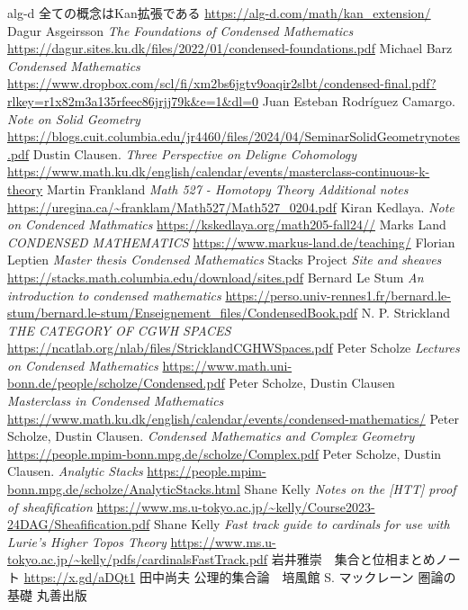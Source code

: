 \documentclass[dvipdfmx,a4paper,11pt]{report}
\theoremstyle{definition}
\begin{document}
\begin{thebibliography}{n}
alg-d 全ての概念はKan拡張である
\url{https://alg-d.com/math/kan_extension/}
Dagur Asgeirsson
\textit{The Foundations of Condensed Mathematics}
\url{https://dagur.sites.ku.dk/files/2022/01/condensed-foundations.pdf}
Michael Barz \textit{Condensed Mathematics}
\url{https://www.dropbox.com/scl/fi/xm2bs6jgtv9oaqir2slbt/condensed-final.pdf?rlkey=r1x82m3a135rfeec86jrjj79k&e=1&dl=0}
Juan Esteban Rodríguez Camargo. \textit{Note on Solid Geometry}
 \url{https://blogs.cuit.columbia.edu/jr4460/files/2024/04/SeminarSolidGeometrynotes.pdf}
 Dustin Clausen. 
 \textit{Three  Perspective on Deligne Cohomology}
 \url{https://www.math.ku.dk/english/calendar/events/masterclass-continuous-k-theory}
Martin Frankland \textit{Math 527 - Homotopy Theory
Additional notes}
\url{https://uregina.ca/~franklam/Math527/Math527_0204.pdf}
Kiran Kedlaya. 
\textit{Note on Condenced Mathmatics}
 \url{https://kskedlaya.org/math205-fall24//}
Marks Land
\textit{CONDENSED MATHEMATICS}
\url{https://www.markus-land.de/teaching/}
Florian Leptien
\textit{Master thesis Condensed Mathematics}
Stacks Project \textit{Site and sheaves}
\url{https://stacks.math.columbia.edu/download/sites.pdf}
Bernard Le Stum
\textit{An introduction to condensed mathematics}
\url{https://perso.univ-rennes1.fr/bernard.le-stum/bernard.le-stum/Enseignement_files/CondensedBook.pdf}
N. P. Strickland
\textit{THE CATEGORY OF CGWH SPACES}
\url{https://ncatlab.org/nlab/files/StricklandCGHWSpaces.pdf}
Peter Scholze
\textit{Lectures on Condensed Mathematics}
\url{https://www.math.uni-bonn.de/people/scholze/Condensed.pdf}
Peter Scholze, Dustin Clausen
\textit{Masterclass in Condensed Mathematics}
\url{https://www.math.ku.dk/english/calendar/events/condensed-mathematics/}
Peter Scholze, Dustin Clausen. 
\textit{Condensed Mathematics and Complex Geometry}
 \url{https://people.mpim-bonn.mpg.de/scholze/Complex.pdf}
Peter Scholze, Dustin Clausen. \textit{Analytic Stacks} \url{https://people.mpim-bonn.mpg.de/scholze/AnalyticStacks.html}
Shane Kelly \textit{Notes on the [HTT] proof of sheafification}
\url{https://www.ms.u-tokyo.ac.jp/~kelly/Course2023-24DAG/Sheafification.pdf}
Shane Kelly
\textit{Fast track guide to cardinals for use with Lurie’s Higher Topos Theory}
\url{https://www.ms.u-tokyo.ac.jp/~kelly/pdfs/cardinalsFastTrack.pdf}
岩井雅崇　集合と位相まとめノート
\url{https://x.gd/aDQt1}
田中尚夫 公理的集合論　培風館
S. マックレーン 圏論の基礎 丸善出版
\end{thebibliography}
 
\end{document}
